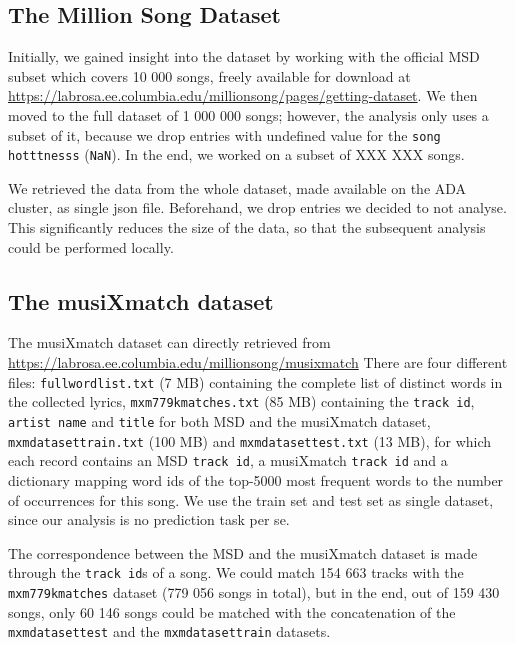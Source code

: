 \documentclass[11pt]{article}
\renewcommand\_{\textunderscore\allowbreak}
\begin{document}
\subsection{The Million Song Dataset}
Initially, we gained insight into the dataset by working with the official MSD subset which covers 10 000 songs, freely available for download at \url{https://labrosa.ee.columbia.edu/millionsong/pages/getting-dataset}.
We then moved to the full dataset of 1 000 000 songs; however, the analysis only uses a subset of it,  because we drop entries with undefined value for the \texttt{song hotttnesss} (\texttt{NaN}).
In the end, we worked on a subset of XXX XXX songs.

We retrieved the data from the whole dataset, made available on the ADA cluster, as single json file. Beforehand, we drop entries we decided to not analyse. 
This significantly reduces the size of the data, so that the subsequent analysis could be performed locally.

\subsection{The musiXmatch dataset}
The musiXmatch dataset can directly retrieved from \url{https://labrosa.ee.columbia.edu/millionsong/musixmatch}
There are four different files: 
\texttt{full\_word\_list.txt} (7 MB) containing the complete list of distinct words in the collected lyrics, \texttt{mxm\_779k\_matches.txt} (85 MB) containing the \texttt{track id}, \texttt{artist name} and \texttt{title} for both MSD and the musiXmatch dataset, \texttt{mxm\_dataset\_train.txt} (100 MB) and \texttt{mxm\_dataset\_test.txt} (13 MB), for which each record contains an MSD \texttt{track id}, a musiXmatch \texttt{track id} and a dictionary mapping word ids of the top-5000 most frequent words to the number of occurrences for this song.
We use the train set and test set as single dataset, since our analysis is no prediction task per se.

The correspondence between the MSD and the musiXmatch dataset is made through the \texttt{track id}s of a song.
We could match 154 663 tracks with the \texttt{mxm\_779k\_matches} dataset (779 056 songs in total), but in the end, out of 159 430 songs, only 60 146 songs could be matched with the concatenation of the \texttt{mxm\_dataset\_test} and the \texttt{mxm\_dataset\_train} datasets.
\end{document}

